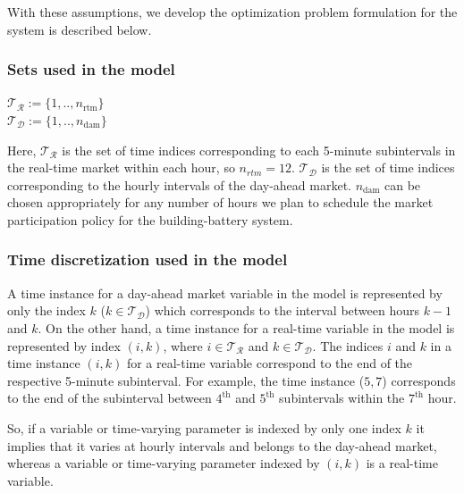 \documentclass[11pt,twoside]{article}
\begin{document}
With these assumptions, we develop the optimization problem formulation for the system is described below.
\subsubsection{Sets used in the model}
\begin{center}
$\mathcal{T_R} := \{1,..,n_{\textrm{rtm}}\}$\\$ \mathcal{T_D} :=  \{1,..,n_{\textrm{dam}}\}$
\end{center}
Here, $\mathcal{T_R}$ is the set of time indices corresponding to each 5-minute subintervals in the real-time market within each hour, so $n_{rtm}=12$. $\mathcal{T_D}$ is the set of time indices corresponding to the hourly intervals of the day-ahead market. $n_\text{dam}$ can be chosen appropriately for any number of hours we plan to schedule the market participation policy for the building-battery system.
\subsubsection{Time discretization used in the model}
A time instance for a day-ahead market variable in the model is represented by only the index $k$ ($k \in \mathcal{T_D}$) which corresponds to the interval between hours $k-1$ and $k$. On the other hand, a time instance for a real-time variable in the model is represented by index $(i,k)$, where $i \in \mathcal{T_R}$ and $ k \in \mathcal{T_D}$. The indices $i$ and $k$ in a time instance $(i,k)$ for a real-time variable correspond to the end of the respective 5-minute subinterval. For example, the time instance ($5,7$) corresponds to the end of the subinterval between $4^{\text{th}}$ and $5^{\text{th}}$ subintervals within the $7^\textrm{th}$ hour. 

So, if a variable or time-varying parameter is indexed by only one index $k$ it implies that it varies at hourly intervals and belongs to the day-ahead market, whereas a variable or time-varying parameter indexed by $(i,k)$ is a real-time variable. 
\end{document}
